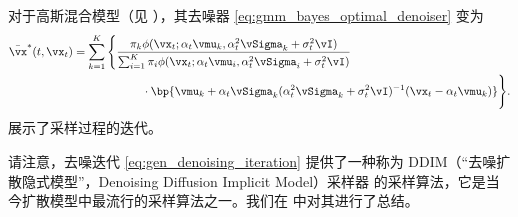 \documentclass[../../book-main_zh.tex]{subfiles}
\begin{document}
\begin{example}[高斯混合模型]
    对于高斯混合模型（见 ），其去噪器 \eqref{eq:gmm_bayes_optimal_denoiser} 变为
    \begin{align}\label{eq:gen_gmm_bayes_optimal_denoiser}
        \bar{\vx}^{\ast}(t, \vx_{t})
        &= \sum_{k = 1}^{K}\Bigg\{\frac{\pi_{k}\phi(\vx_{t}
                    ; \alpha_{t}\vmu_{k}, \alpha_{t}^{2}\vSigma_{k}
            + \sigma_{t}^{2}\vI)}{\sum_{i = 1}^{K}\pi_{i}\phi(\vx_{t} ;
                    \alpha_{t}\vmu_{i}, \alpha_{t}^{2}\vSigma_{i} +
            \sigma_{t}^{2}\vI)} \\
            &\qquad \qquad \qquad \cdot\bp{\vmu_{k} +
                \alpha_{t}\vSigma_{k}(\alpha_{t}^{2}\vSigma_{k} +
        \sigma_{t}^{2}\vI)^{-1}(\vx_{t} - \alpha_{t}\vmu_{k})}\Bigg\}. \nonumber
    \end{align}
     展示了采样过程的迭代。
\end{example}

请注意，去噪迭代 \eqref{eq:gen_denoising_iteration} 提供了一种称为 DDIM（“去噪扩散隐式模型”，Denoising Diffusion Implicit Model）采样器 \cite{song2020denoising} 的采样算法，它是当今扩散模型中最流行的采样算法之一。我们在  中对其进行了总结。

\begin{algorithm}
    \caption{使用去噪器进行采样。}
    \label{alg:iterative_denoising}
    \begin{algorithmic}[1]
         
        \EndFor
        \EndFunction
    \end{algorithmic}
\end{algorithm}
\end{document}
